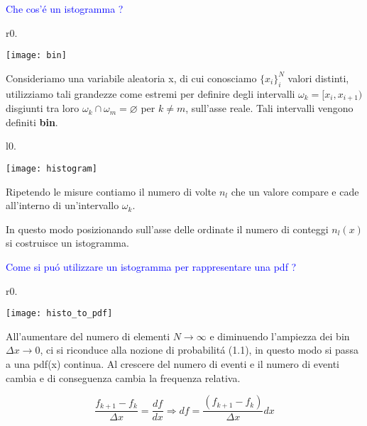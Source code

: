 \documentclass[11pt,a4paper]{book}
\begin{document}
\textcolor{blue}{Che cos'\'{e} un istogramma ?}\newline


\begin{wrapfigure}{r}{0.\textwidth}
\centering

\texttt{[image: bin]}	

\end{wrapfigure}

Consideriamo una variabile aleatoria x, di cui conosciamo $\{x_i\}_i^N$ valori distinti, utilizziamo tali grandezze come estremi per definire degli intervalli $\omega_{k} = [x_i, x_{i+1}) $ disgiunti tra loro $\omega_{k} \cap \omega_{m} = \varnothing$ per $k \neq m$, sull'asse reale. Tali intervalli vengono definiti \textbf{bin}.

\begin{wrapfigure}[3]{l}{0.\textwidth}

\centering

\texttt{[image: histogram]}	

\end{wrapfigure}

Ripetendo le misure contiamo il numero di volte $n_l$ che un valore compare e cade all'interno di un'intervallo $\omega_k$. 

In questo modo posizionando sull'asse delle ordinate il numero di conteggi $n_l(x)$ si costruisce un istogramma. \newline

\textcolor{blue}{Come si pu\'{o} utilizzare un istogramma per rappresentare una pdf ?}\newline


\begin{wrapfigure}{r}{0.\textwidth}

\centering

\texttt{[image: histo\_to\_pdf]}	

\end{wrapfigure}

All'aumentare del numero di elementi $N \rightarrow \infty$ e diminuendo l'ampiezza dei bin $\Delta x \rightarrow 0 $, ci si riconduce alla nozione di probabilit\'{a} (1.1), in questo modo si passa a una pdf(x) continua.
Al crescere del numero di eventi e il numero di eventi cambia  e di conseguenza cambia la frequenza relativa.

\begin{equation}
	\dfrac{f_{k+1} - f_{k}}{\Delta x} = \dfrac{df}{dx} \Rightarrow df = \dfrac{(f_{k+1} - f_{k})}{\Delta x}dx
\end{equation}
\end{document}
